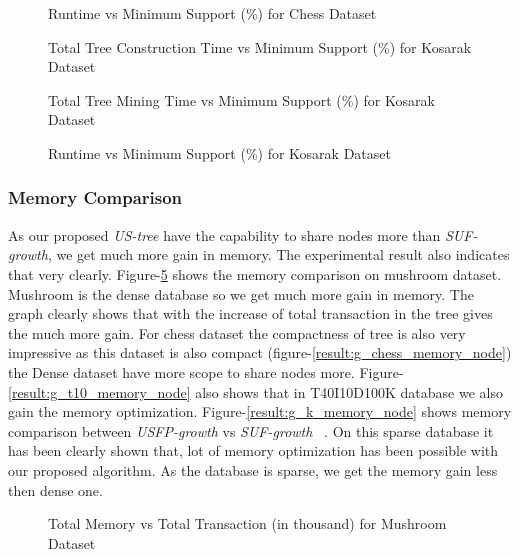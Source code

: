             \begin{figure}[h]
            \centering
                
            \caption{Runtime vs Minimum Support (\%) for Chess Dataset }
            \label{result:g_chess_total}
            \end{figure}
            \begin{figure}[h]
            \centering
                
            \caption{Total Tree Construction Time vs Minimum Support (\%) for Kosarak Dataset }
            \label{result:g_k_tree_construction_total}
            \end{figure}
            
            \begin{figure}[h]
            \centering
                
            \caption{Total Tree Mining Time vs Minimum Support (\%) for Kosarak Dataset }
            \label{result:g_k_mining_total}
            \end{figure}

            \begin{figure}[h]
            \centering
                
            \caption{Runtime vs Minimum Support (\%) for Kosarak Dataset }
            \label{result:g_k_total}
            \end{figure}
            
\clearpage
    \subsubsection{Memory Comparison}
        As our proposed \emph{US-tree} have the capability to share nodes more than \emph{SUF-growth}, we get much more gain in memory. The experimental result also indicates that very clearly. Figure-\ref{result:g_m_memory_node} shows the memory comparison on mushroom dataset. Mushroom is the dense database so we get  much more gain in memory. The graph clearly shows that with the increase of total transaction in the tree gives the much more gain. For chess dataset the compactness of tree is also very impressive as this dataset is also compact (figure-\ref{result:g_chess_memory_node}) the Dense dataset have more scope to share nodes more. Figure-\ref{result:g_t10_memory_node} also shows that in T40I10D100K database we also gain the memory optimization. Figure-\ref{result:g_k_memory_node} shows memory comparison between \emph{USFP-growth} vs \emph{SUF-growth} ~\cite{suf_growth}. On this sparse database it has been clearly shown that, lot of memory optimization has been possible with our proposed algorithm. As the database is sparse, we get the memory gain less then dense one.
            \begin{figure}[h]
            \centering
                
            \caption{Total Memory vs Total Transaction (in thousand) for Mushroom Dataset }
            \label{result:g_m_memory_node}
            \end{figure}
            
